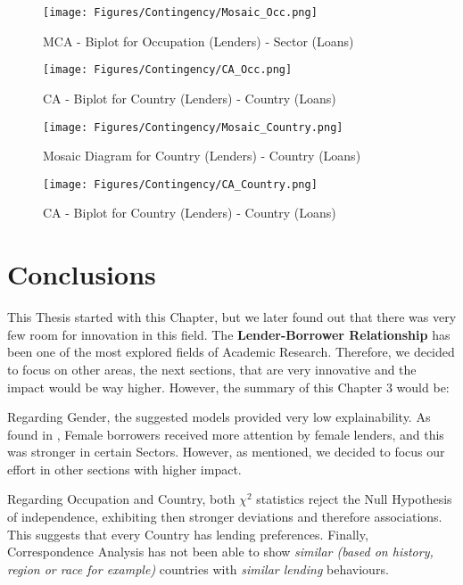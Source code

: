 % 

\begin{figure}[h]
\centering
\texttt{[image: Figures/Contingency/Mosaic\_Occ.png]}
\caption{MCA - Biplot for Occupation (Lenders) - Sector (Loans)}
\label{fig:Mosaic_Occ}
\bigbreak
\texttt{[image: Figures/Contingency/CA\_Occ.png]}
\caption{CA - Biplot for Country (Lenders) - Country (Loans)}
\label{fig:CA_Occ}
\end{figure}

% 

\begin{figure}[h]
\centering
\texttt{[image: Figures/Contingency/Mosaic\_Country.png]}
\caption{Mosaic Diagram for Country (Lenders) - Country (Loans)}
\label{fig:Mosaic_Country}
\bigbreak
\texttt{[image: Figures/Contingency/CA\_Country.png]}
\caption{CA - Biplot for Country (Lenders) - Country (Loans)}
\label{fig:CA_Country}
\end{figure}

\newpage
\section{Conclusions}

This Thesis started with this Chapter, but we later found out that there was very few room for innovation in this field. The \textbf{Lender-Borrower Relationship} has been one of the most explored fields of Academic Research. Therefore, we decided to focus on other areas, the next sections, that are very innovative and the impact would be way higher.
However, the summary of this Chapter 3 would be: \par
Regarding Gender, the suggested models provided very low explainability. As found in \textcite{Greenberg2015}, Female borrowers received more attention by female lenders, and this was stronger in certain Sectors. However, as mentioned, we decided to focus our effort in other sections with higher impact. \par
Regarding Occupation and Country, both $\chi^2$ statistics reject the Null Hypothesis of independence, exhibiting then stronger deviations and therefore associations. This suggests that every Country has lending preferences. Finally, Correspondence Analysis has not been able to show \textit{similar (based on history, region or race for example)} countries with \textit{similar lending} behaviours. \par
